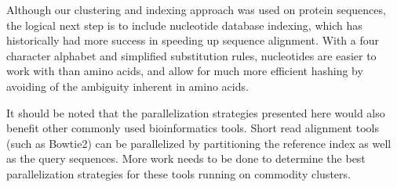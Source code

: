 Although our clustering and indexing approach was used on protein sequences, the logical next step is to include nucleotide database indexing, which has historically had more success in speeding up sequence alignment\cite{kent2002blat}.
With a four character alphabet and simplified substitution rules, nucleotides are easier to work with than amino acids, and allow for much more efficient hashing by avoiding of the ambiguity inherent in amino acids.

It should be noted that the parallelization strategies presented here would also benefit other commonly used bioinformatics tools.  Short read alignment tools (such as Bowtie2\cite{langmead2012fast}) can be parallelized by partitioning the reference index as well as the query sequences.  More work needs to be done to determine the best parallelization strategies for these tools running on commodity clusters.

%
%
